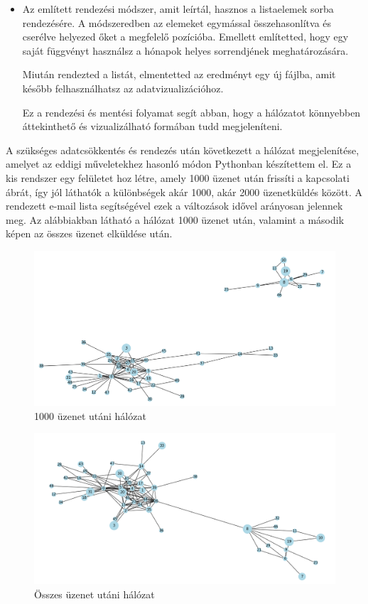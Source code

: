 \begin{itemize}
\begin{figure}[!h]
    \end{figure}
    \item Az említett rendezési módszer, amit leírtál, hasznos a listaelemek sorba rendezésére. A módszeredben az elemeket egymással összehasonlítva és cserélve helyezed őket a megfelelő pozícióba. Emellett említetted, hogy egy saját függvényt használsz a hónapok helyes sorrendjének meghatározására.

Miután rendezted a listát, elmentetted az eredményt egy új fájlba, amit később felhasználhatsz az adatvizualizációhoz.

Ez a rendezési és mentési folyamat segít abban, hogy a hálózatot könnyebben áttekinthető és vizualizálható formában tudd megjeleníteni.
  
\end{itemize}
A szükséges adatcsökkentés és rendezés után következett a hálózat megjelenítése, amelyet az eddigi műveletekhez hasonló módon Pythonban készítettem el. Ez a kis rendszer egy felületet hoz létre, amely 1000 üzenet után frissíti a kapcsolati ábrát, így jól láthatók a különbségek akár 1000, akár 2000 üzenetküldés között. A rendezett e-mail lista segítségével ezek a változások idővel arányosan jelennek meg. Az alábbiakban látható a hálózat 1000 üzenet után, valamint a második képen az összes üzenet elküldése után.
\begin{figure}[h]
        \centering
        \includegraphics[scale=0.4]{images/elsorajz}
        \caption{1000 üzenet utáni hálózat}
        
    \end{figure}
    \begin{figure}[h]
        \centering
        \includegraphics[scale=0.35]{images/utolsorajz}
        \caption{Összes üzenet utáni hálózat }
        
    \end{figure}

